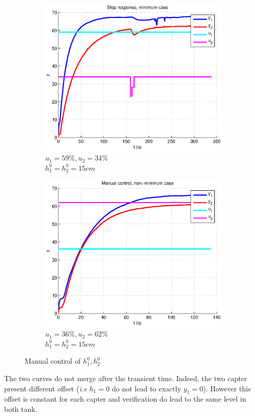 \begin{figure}[h!t]
        \centering
        \begin{subfigure}[b]{0.45\columnwidth}
                \includegraphics[width=\columnwidth]{fig/manualcontrolmin.eps}
                \caption{$u_1 = 59\%, u_2 = 34\%$ \\ $h_1^0 = h_2^0 = 15cm$}
        \end{subfigure}
        \begin{subfigure}[b]{0.45\columnwidth}
                \includegraphics[width=\columnwidth]{fig/manualcontrolnonmin.eps}
                \caption{$u_1 = 36\%, u_2 = 62\%$ \\ $h_1^0 = h_2^0 = 15cm$}
        \end{subfigure}
        \caption{Manual control of $h_1^0, h_2^0$}
        \label{manualcontrol}
\end{figure}



The two curves do not merge after the transient time. Indeed, the two capter present different offset (\emph{i.e} $h_1 = 0$ do not lead to exactly $y_1 = 0$).
However this offset is constant for each capter and verification do lead to the same level in both tank.

